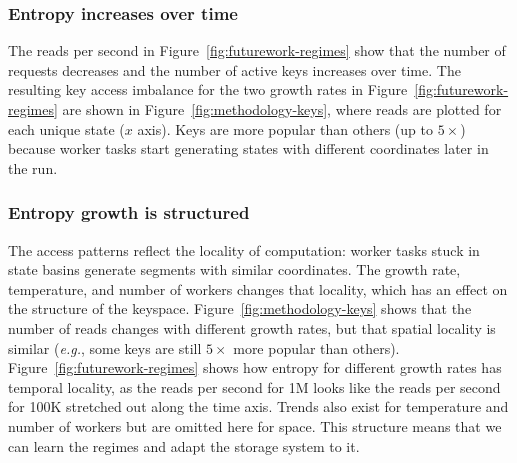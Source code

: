 \subsubsection*{Entropy increases over time} The reads per second in
Figure~\ref{fig:futurework-regimes} show that the number of requests decreases
and the number of active keys increases over time. The resulting key access
imbalance for the two growth rates in Figure~\ref{fig:futurework-regimes} are
shown in Figure~\ref{fig:methodology-keys}, where reads are plotted for each
unique state (\(x\) axis). Keys are more popular than others (up to
\(5\times\)) because worker tasks start generating states with different
coordinates later in the run.

\subsubsection*{Entropy growth is structured} The access patterns reflect the
locality of computation: worker tasks stuck in state basins generate segments with
similar coordinates. The growth rate, temperature, and number of workers
changes that locality, which has an effect on the structure of the keyspace.
Figure~\ref{fig:methodology-keys} shows that the number of reads changes with
different growth rates, but that spatial locality is similar ({\it e.g.}, some
keys are still \(5\times\) more popular than others).
Figure~\ref{fig:futurework-regimes} shows how entropy for different growth
rates has temporal locality, as the reads per second for 1M looks like the
reads per second for 100K stretched out along the time axis.  Trends also exist
for temperature and number of workers but are omitted here for space. This
structure means that we can learn the regimes and adapt the storage system to
it. 
